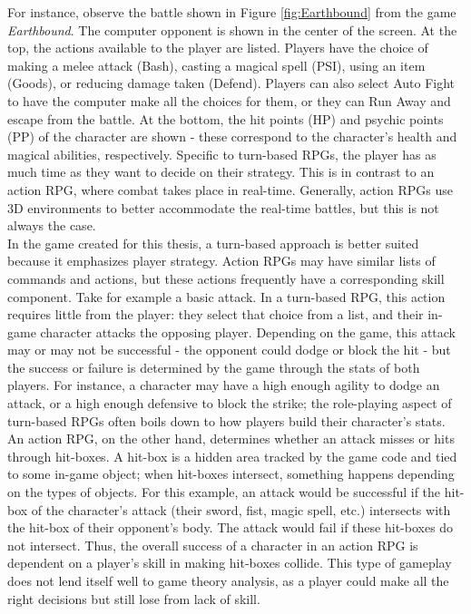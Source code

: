 For instance, observe the battle shown in Figure \ref{fig:Earthbound} from the game \textit{Earthbound}. The computer opponent is shown in the center of the screen. At the top, the actions available to the player are listed. Players have the choice of making a melee attack (Bash), casting a magical spell (PSI), using an item (Goods), or reducing damage taken (Defend). Players can also select Auto Fight to have the computer make all the choices for them, or they can Run Away and escape from the battle. At the bottom, the hit points (HP) and psychic points (PP) of the character are shown - these correspond to the character's health and magical abilities, respectively. Specific to turn-based RPGs, the player has as much time as they want to decide on their strategy. This is in contrast to an action RPG, where combat takes place in real-time. Generally, action RPGs use 3D environments to better accommodate the real-time battles, but this is not always the case.\\

In the game created for this thesis, a turn-based approach is better suited because it emphasizes player strategy. Action RPGs may have similar lists of commands and actions, but these actions frequently have a corresponding skill component. Take for example a basic attack. In a turn-based RPG, this action requires little from the player: they select that choice from a list, and their in-game character attacks the opposing player. Depending on the game, this attack may or may not be successful - the opponent could dodge or block the hit - but the success or failure is determined by the game through the stats of both players. For instance, a character may have a high enough agility to dodge an attack, or a high enough defensive to block the strike; the role-playing aspect of turn-based RPGs often boils down to how players build their character's stats. An action RPG, on the other hand, determines whether an attack misses or hits through hit-boxes. A hit-box is a hidden area tracked by the game code and tied to some in-game object; when hit-boxes intersect, something happens depending on the types of objects. For this example, an attack would be successful if the hit-box of the character's attack (their sword, fist, magic spell, etc.) intersects with the hit-box of their opponent's body. The attack would fail if these hit-boxes do not intersect. Thus, the overall success of a character in an action RPG is dependent on a player's skill in making hit-boxes collide. This type of gameplay does not lend itself well to game theory analysis, as a player could make all the right decisions but still lose from lack of skill.\\


